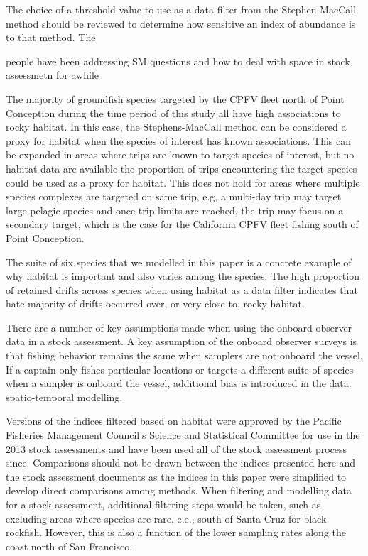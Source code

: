 \documentclass[
  12pt,
  authoryear,
  preprint,
  3p]{elsarticle}
\begin{document}
The choice of a threshold value to use as a data filter from the
Stephen-MacCall method should be reviewed to determine how sensitive an
index of abundance is to that method. The

people have been addressing SM questions and how to deal with space in
stock assessmetn for awhile

The majority of groundfish species targeted by the CPFV fleet north of
Point Conception during the time period of this study all have high
associations to rocky habitat. In this case, the Stephens-MacCall method
can be considered a proxy for habitat when the species of interest has
known associations. This can be expanded in areas where trips are known
to target species of interest, but no habitat data are available the
proportion of trips encountering the target species could be used as a
proxy for habitat. This does not hold for areas where multiple species
complexes are targeted on same trip, e.g, a multi-day trip may target
large pelagic species and once trip limits are reached, the trip may
focus on a secondary target, which is the case for the California CPFV
fleet fishing south of Point Conception.

The suite of six species that we modelled in this paper is a concrete
example of why habitat is important and also varies among the species.
The high proportion of retained drifts across species when using habitat
as a data filter indicates that hate majority of drifts occurred over,
or very close to, rocky habitat.

There are a number of key assumptions made when using the onboard
observer data in a stock assessment. A key assumption of the onboard
observer surveys is that fishing behavior remains the same when samplers
are not onboard the vessel. If a captain only fishes particular
locations or targets a different suite of species when a sampler is
onboard the vessel, additional bias is introduced in the data.\\
spatio-temporal modelling.

Versions of the indices filtered based on habitat were approved by the
Pacific Fisheries Management Council's Science and Statistical Committee
for use in the 2013 stock assessments and have been used all of the
stock assessment process since. Comparisons should not be drawn between
the indices presented here and the stock assessment documents as the
indices in this paper were simplified to develop direct comparisons
among methods. When filtering and modelling data for a stock assessment,
additional filtering steps would be taken, such as excluding areas where
species are rare, e.e., south of Santa Cruz for black rockfish. However,
this is also a function of the lower sampling rates along the coast
north of San Francisco.
\end{document}
